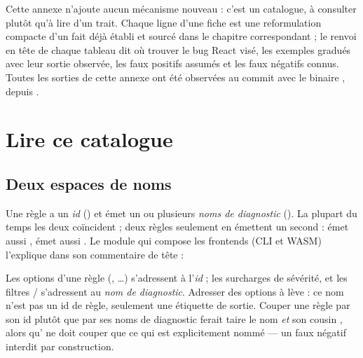 Cette annexe n'ajoute aucun mécanisme nouveau : c'est un catalogue, à consulter plutôt qu'à lire d'un trait. Chaque ligne d'une fiche est une reformulation compacte d'un fait déjà établi et sourcé dans le chapitre correspondant ; le renvoi  en tête de chaque tableau dit où trouver le bug React visé, les exemples gradués avec leur sortie observée, les faux positifs assumés et les faux négatifs connus. Toutes les sorties de cette annexe ont été observées au commit \snapshotCommit{} avec le binaire , depuis .

\section{Lire ce catalogue}
\label{sec:catalogue-regles-lire}

\subsection{Deux espaces de noms}

Une règle a un \emph{id} () et émet un ou plusieurs \emph{noms de diagnostic} (). La plupart du temps les deux coïncident ; deux règles seulement en émettent un second :  émet aussi ,  émet aussi . Le module qui compose les frontends (CLI et WASM) l'explique dans son commentaire de tête :


\begin{piege}
Les options d'une règle (, \ldots) s'adressent à l'\emph{id} ; les surcharges de sévérité,  et les filtres / s'adressent au \emph{nom de diagnostic}. Adresser des options à  lève  : ce nom n'est pas un id de règle, seulement une étiquette de sortie. Couper une règle par son id plutôt que par ses noms de diagnostic ferait taire le nom \emph{et} son cousin , alors qu' ne doit couper que ce qui est explicitement nommé --- un faux négatif interdit par construction.
\end{piege}

